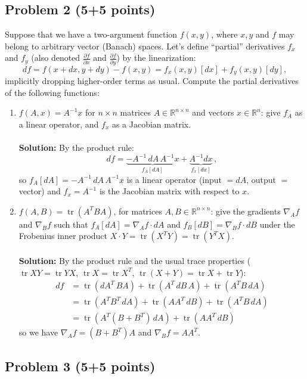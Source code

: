 \documentclass{article}
\newcommand{\R}{\mathbb{R}}
\newcommand{\tr}{\operatorname{tr}}
\begin{document}
\begin{enumerate}
\end{enumerate}

\subsection*{Problem 2 (5+5 points)}

Suppose that we have a two-argument function $f(x,y)$, where $x,y$
and $f$ may belong to arbitrary vector (Banach) spaces. Let's define
``partial'' derivatives $f_{x}$ and $f_{y}$ (also denoted $\frac{\partial f}{\partial x}$
and $\frac{\partial f}{\partial y}$) by the linearization: 
\[
df=f(x+dx,y+dy)-f(x,y)=f_{x}(x,y)[dx]+f_{y}(x,y)[dy],
\]
implicitly dropping higher-order terms as usual. Compute the partial
derivatives of the following functions:
\begin{enumerate}
\item $f(A,x)=A^{-1}x$ for $n\times n$ matrices $A\in\R^{n\times n}$
and vectors $x\in\R^{n}$: give $f_{A}$ as a linear operator,
and $f_{x}$ as a Jacobian matrix.
\\
\\
\textbf{Solution:} By the product rule:
$$
df = \underbrace{-A^{-1}\, dA \, A^{-1} x}_{f_A[dA]} + \underbrace{A^{-1} dx}_{f_x[dx]} \, ,
$$
so $\boxed{f_A[dA] = -A^{-1}\, dA \, A^{-1} x}$ is a linear operator (input $=dA$, output $=$ vector) and $\boxed{f_x = A^{-1}}$ is the Jacobian matrix with respect to $x$.

\item $f(A,B)=\tr(A^{T}BA)$, for matrices $A,B\in\R^{n\times n}$:
give the gradients $\nabla_{A}f$ and $\nabla_{B}f$ such that $f_{A}[dA]=\nabla_{A}f\cdot dA$
and $f_{B}[dB]=\nabla_{B}f\cdot dB$ under the Frobenius inner product
$X\cdot Y=\tr(X^{T}Y)=\tr(Y^{T}X)$.
\\
\\
\textbf{Solution:} By the product rule and the usual trace properties ($\tr XY = \tr YX$, $\tr X = \tr X^T$, $\tr(X+Y)=\tr X + \tr Y$):
\begin{align*}
df &= \tr(dA^T\,BA) + \tr(A^T\,dB\,A) + \tr(A^TB\,dA) \\
&= \tr(A^T B^T\, dA) + \tr(AA^T\,dB) + \tr(A^TB\,dA) \\
&= \tr(A^T (B+B^T)\, dA)+ \tr(AA^T\,dB)
\end{align*}
so we have $\boxed{\nabla_A f = (B+B^T) A}$ and $\boxed{\nabla_B f = AA^T}$.

\end{enumerate}

\subsection*{Problem 3 (5+5 points)}
\end{document}
